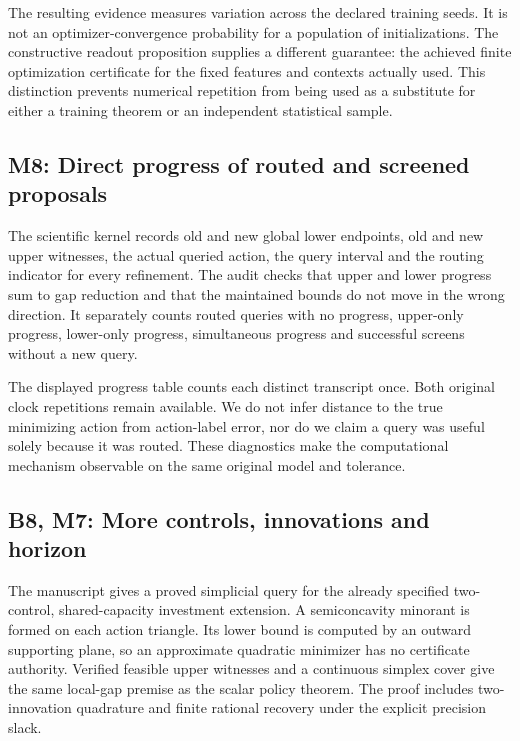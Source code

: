 The resulting evidence measures variation across the declared training
seeds. It is not an optimizer-convergence probability for a population
of initializations. The constructive readout proposition supplies a
different guarantee: the achieved finite optimization certificate for
the fixed features and contexts actually used. This distinction prevents
numerical repetition from being used as a substitute for either a
training theorem or an independent statistical sample.

\hypertarget{m8-direct-progress-of-routed-and-screened-proposals}{%
\subsection{M8: Direct progress of routed and screened
proposals}\label{m8-direct-progress-of-routed-and-screened-proposals}}

The scientific kernel records old and new global lower endpoints, old
and new upper witnesses, the actual queried action, the query interval
and the routing indicator for every refinement. The audit checks that
upper and lower progress sum to gap reduction and that the maintained
bounds do not move in the wrong direction. It separately counts routed
queries with no progress, upper-only progress, lower-only progress,
simultaneous progress and successful screens without a new query.

The displayed progress table counts each distinct transcript once. Both
original clock repetitions remain available. We do not infer distance to
the true minimizing action from action-label error, nor do we claim a
query was useful solely because it was routed. These diagnostics make
the computational mechanism observable on the same original model and
tolerance.

\hypertarget{b8-m7-more-controls-innovations-and-horizon}{%
\subsection{B8, M7: More controls, innovations and
horizon}\label{b8-m7-more-controls-innovations-and-horizon}}

The manuscript gives a proved simplicial query for the already specified
two-control, shared-capacity investment extension. A semiconcavity
minorant is formed on each action triangle. Its lower bound is computed
by an outward supporting plane, so an approximate quadratic minimizer
has no certificate authority. Verified feasible upper witnesses and a
continuous simplex cover give the same local-gap premise as the scalar
policy theorem. The proof includes two-innovation quadrature and finite
rational recovery under the explicit precision slack.

